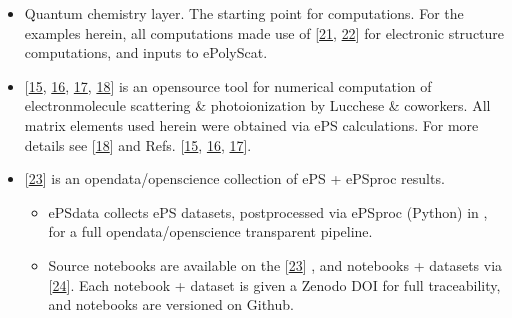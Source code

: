 \documentclass[letterpaper,table,10pt,english]{jupyterBook}
\begin{document}
\begin{itemize}
\item {} 
\sphinxAtStartPar
Quantum chemistry layer. The starting point for  computations. For the examples herein, all computations made use of  {[}\hyperlink{cite.backmatter/bibliography:id522}{21}, \hyperlink{cite.backmatter/bibliography:id532}{22}{]} for electronic structure computations, and inputs to ePolyScat.

\item {} 
\sphinxAtStartPar
{} {[}\hyperlink{cite.backmatter/bibliography:id640}{15}, \hyperlink{cite.backmatter/bibliography:id527}{16}, \hyperlink{cite.backmatter/bibliography:id671}{17}, \hyperlink{cite.backmatter/bibliography:id643}{18}{]} is an open\sphinxhyphen{}source tool for numerical computation of electron\sphinxhyphen{}molecule scattering \& photoionization by Lucchese \& coworkers. All matrix elements used herein were obtained via ePS calculations. For more details see  {[}\hyperlink{cite.backmatter/bibliography:id643}{18}{]} and Refs. {[}\hyperlink{cite.backmatter/bibliography:id640}{15}, \hyperlink{cite.backmatter/bibliography:id527}{16}, \hyperlink{cite.backmatter/bibliography:id671}{17}{]}.

\item {} 
\sphinxAtStartPar
{} {[}\hyperlink{cite.backmatter/bibliography:id571}{23}{]} is an open\sphinxhyphen{}data/open\sphinxhyphen{}science collection of ePS + ePSproc results.
\begin{itemize}
\item {} 
\sphinxAtStartPar
ePSdata collects ePS datasets, post\sphinxhyphen{}processed via ePSproc (Python) in , for a full open\sphinxhyphen{}data/open\sphinxhyphen{}science transparent pipeline.

\end{itemize}
\begin{itemize}
\item {} 
\sphinxAtStartPar
Source notebooks are available on the  {[}\hyperlink{cite.backmatter/bibliography:id571}{23}{]} , and notebooks + datasets via  {[}\hyperlink{cite.backmatter/bibliography:id572}{24}{]}. Each notebook + dataset is given a Zenodo DOI for full traceability, and notebooks are versioned on Github.


\end{itemize}
\end{itemize}
\end{document}
